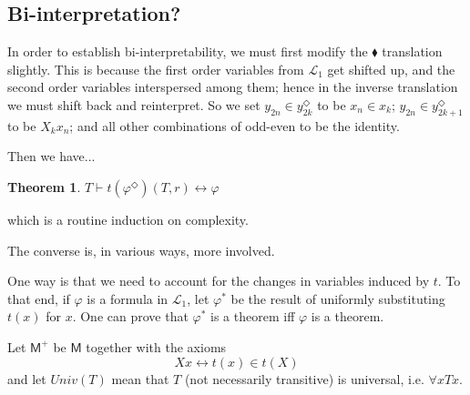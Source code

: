 \documentclass{article}
\newtheorem{Theorem}{Theorem}[section]
\theoremstyle{definition}
\begin{document}
\subsection{Bi-interpretation?}
In order to establish bi-interpretability, we must first modify the $\blacklozenge$ 
translation slightly. This is because the first order variables from $\mathcal{L}_1$ 
get shifted up, and the second order variables interspersed among them; hence 
in the inverse translation we must shift back and reinterpret. So we set 
$y_{2n} \in y_{2k}^\Diamond$ to be $x_n \in x_k$;
$y_{2n} \in y_{2k+1}^\Diamond$ to be $X_k x_n$; and all other combinations of odd-even 
to be the identity.

Then we have...
\begin{Theorem}
    $T \vdash t(\varphi^\Diamond)(T, r) \leftrightarrow \varphi$
\end{Theorem}
which is a routine induction on complexity.

The converse is, in various ways, more involved. 

One way is that we need to account for the changes in variables induced by $t$. 
To that end, if $\varphi$ is a formula in $\mathcal{L}_1$, let 
$\varphi^*$ be the result of uniformly substituting $t(x)$ for $x$. 
One can prove that $\varphi^*$ is a theorem iff $\varphi$ is a theorem. 

Let $\mathsf{M}^+$ be $\mathsf{M}$ together with the axioms 
\begin{equation}
    Xx \leftrightarrow t(x) \in t(X)
\end{equation}
and let $Univ(T)$ mean that $T$ (not necessarily transitive) is universal, 
i.e. $\forall x Tx$. 
\end{document}
